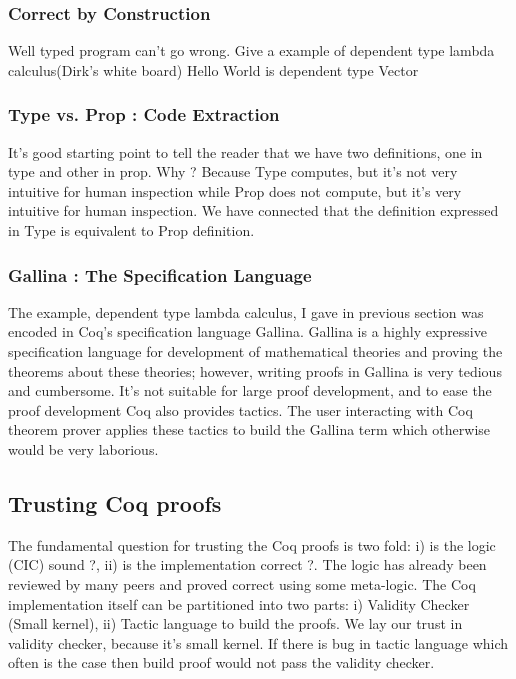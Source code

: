  \subsubsection{Correct by Construction}
  Well typed program can't go wrong. 
  Give a example of dependent type lambda calculus(Dirk's white board)
  Hello World is dependent type Vector 
 \subsubsection{Type vs. Prop : Code Extraction}
  It's good starting point to tell the reader that we have two definitions, 
  one in type and other in prop. Why ? Because Type computes, but it's
  not very intuitive for human inspection while Prop does not compute, 
  but it's very intuitive for human inspection. We have connected that 
  the definition expressed in Type is equivalent to Prop definition. 
 
 \subsubsection{Gallina : The Specification Language}
  The example, dependent type lambda calculus, I gave in previous 
  section was encoded in Coq's specification language Gallina. 
  Gallina is a highly expressive specification 
  language for development of mathematical theories and proving the    
  theorems about these  theories; however, writing proofs in Gallina
  is very tedious and cumbersome. It's not suitable for large proof 
  development, and to ease the proof development Coq also provides 
  tactics.  The user interacting with Coq theorem prover applies these 
  tactics to build the  Gallina term  which otherwise would  
  be very laborious.
  
  
 
  

 
 \subsection{Trusting Coq proofs}
  The fundamental question for trusting the Coq proofs is two fold: 
  i) is the logic (CIC) sound ?, ii) is the implementation correct ?. 
  The logic has already been reviewed by many peers and proved correct 
  using some meta-logic. The 
  Coq implementation itself can be partitioned into two parts: 
  i) Validity Checker (Small kernel), 
  ii) Tactic language to build the proofs.
  We lay our trust in validity checker, because it's small kernel. If there
  is bug in tactic language which often is the case then build proof would 
  not pass the validity checker.  
  
